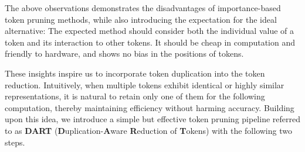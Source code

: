The above observations demonstrates the disadvantages of importance-based token pruning methods, while also introducing the expectation for the ideal alternative: The expected method should consider both the individual value of a token and its interaction to other tokens. It should be cheap in computation and friendly to hardware, and shows no bias in the positions of tokens.



These insights inspire us to incorporate token duplication into the token reduction. Intuitively, when multiple tokens exhibit identical or highly similar representations, it is natural to retain only one of them for the following computation, thereby maintaining efficiency without harming accuracy. Building upon this idea, we introduce a simple but effective token pruning pipeline referred to as \textbf{DART} (\textbf{D}uplication-\textbf{A}ware
\textbf{R}eduction of \textbf{T}okens) with the following two steps.
% 


